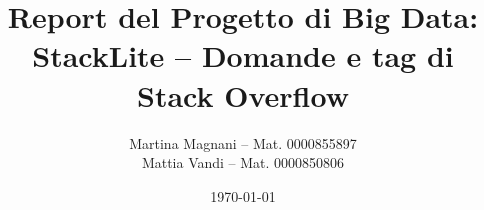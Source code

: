 \documentclass[10pt]{article}
\title{\textbf{Report del Progetto di Big Data: \\StackLite -- Domande e tag di Stack Overflow}}
\author{
	Martina Magnani -- Mat. 0000855897\\
	Mattia Vandi -- Mat. 0000850806}
\date{\today}
\begin{document}
\maketitle
\newpage

\tableofcontents

\newpage

\begin{comment}

\section{Teachers' notes}

Each group should designate a reference user. In the local home directory of such user there must be an {\sf exam} folder exclusively containing the jobs to run (e.g., MapReduce jar, Spark scala file, Spark jar). Also, please send (either by email or by sharing a Git project) the following files.

\begin{itemize}m
\item The source code of the jobs; if more versions have been developed, only send the most efficient one.
\item A text file with the commands to run the job.
\item The PDF file of the report; use Italian/English and Latex/Word at your discretion. Be concise and go straight to the point; do not waste time and space on writing a verbose report.
\end{itemize}

This guide is based on the ``MapReduce+Spark'' kind of project. However, we remind that a different kind of project may be agreed upon.

The evaluation will be based on the following.
\begin{itemize}
\item Compliance of the jobs with the agreed upon specifications.
\item Compliance of the report with this guide.
\item Job correctness.
\item Correct reasoning about optimizations.
\end{itemize}

Appreciated aspects.
\begin{itemize}
\item Code cleanliness and comments.
\item Further considerations in terms of job scalability and extensibility.
\end{itemize}

\end{comment}
\end{document}
